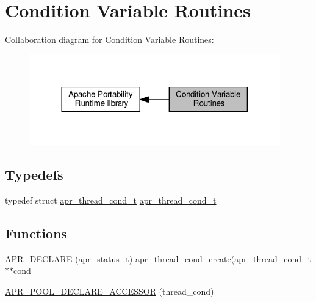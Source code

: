 \hypertarget{group__apr__thread__cond}{}\section{Condition Variable Routines}
\label{group__apr__thread__cond}
Collaboration diagram for Condition Variable Routines\+:
\nopagebreak
\begin{figure}[H]
\begin{center}
\leavevmode
\includegraphics[width=308pt]{group__apr__thread__cond}
\end{center}
\end{figure}
\subsection*{Typedefs}
\begin{DoxyCompactItemize}
\item 
typedef struct \hyperlink{structapr__thread__cond__t}{apr\+\_\+thread\+\_\+cond\+\_\+t} \hyperlink{group__apr__thread__cond_gae8f918d38bf1c58bc09670eee456ae5e}{apr\+\_\+thread\+\_\+cond\+\_\+t}
\end{DoxyCompactItemize}
\subsection*{Functions}
\begin{DoxyCompactItemize}
\item 
\hyperlink{group__apr__thread__cond_ga2521e0e7d60358ca954359ed417e39c5}{A\+P\+R\+\_\+\+D\+E\+C\+L\+A\+RE} (\hyperlink{group__apr__errno_gaa5105fa83cc322f09382292db8b47593}{apr\+\_\+status\+\_\+t}) apr\+\_\+thread\+\_\+cond\+\_\+create(\hyperlink{structapr__thread__cond__t}{apr\+\_\+thread\+\_\+cond\+\_\+t} $\ast$$\ast$cond
\item 
\hyperlink{group__apr__thread__cond_ga9ec6c5e414163a0f987e56160b1991cf}{A\+P\+R\+\_\+\+P\+O\+O\+L\+\_\+\+D\+E\+C\+L\+A\+R\+E\+\_\+\+A\+C\+C\+E\+S\+S\+OR} (thread\+\_\+cond)
\end{DoxyCompactItemize}
